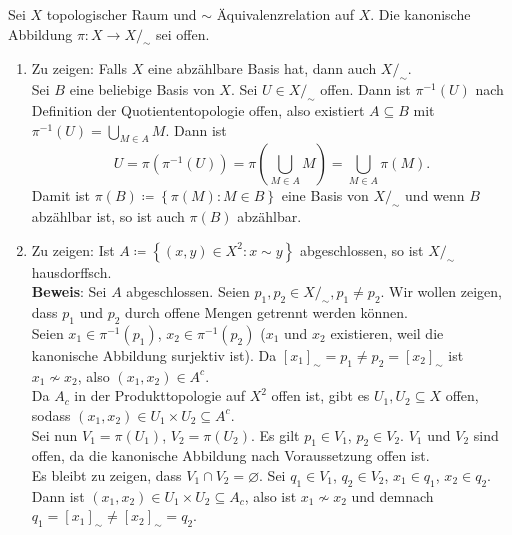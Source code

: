 \begin{problem*}[4]
  Sei $ X $ topologischer Raum und $ \sim $ Äquivalenzrelation auf $ X $. Die kanonische Abbildung $ \pi : X \to X/_\sim $ sei offen.
  \begin{enumerate}
    \item Zu zeigen: Falls $ X $ eine abzählbare Basis hat, dann auch $ X/_\sim $. \\
      Sei $ B $ eine beliebige Basis von $ X $. Sei $ U \in X/_\sim $ offen. Dann ist $ \pi^{-1}(U) $ nach Definition der Quotiententopologie offen, also existiert $ A \subseteq B $ mit $ \pi^{-1}(U) = \bigcup_{M \in A}M $. Dann ist
      \begin{equation*}
        U = \pi(\pi^{-1}(U)) = \pi\left( \bigcup_{M \in A} M \right) = \bigcup_{M \in A}\pi(M)\text{.}
      \end{equation*}
      Damit ist $ \pi(B) \coloneqq \left\{ \pi(M) : M \in B \right\} $ eine Basis von $ X/_\sim $ und wenn $ B $ abzählbar ist, so ist auch $ \pi(B) $ abzählbar.
    \item Zu zeigen: Ist $ A \coloneqq \left\{ (x,y) \in X^2 : x \sim y \right\} $ abgeschlossen, so ist $ X/_\sim $ hausdorffsch. \\
    \textbf{Beweis}: Sei $ A $ abgeschlossen. Seien $ p_1, p_2 \in X/_\sim, p_1 \neq p_2 $. Wir wollen zeigen, dass $ p_1 $ und $ p_2 $ durch offene Mengen getrennt werden können. \\
    Seien $ x_1 \in \pi^{-1}(p_1) $, $ x_2 \in \pi^{-1}(p_2) $ ($ x_1 $ und $ x_2 $ existieren, weil die kanonische Abbildung surjektiv ist). Da $ [x_1]_\sim = p_1 \neq p_2 = [x_2]_\sim $ ist $ x_1 \not \sim x_2 $, also $ (x_1, x_2) \in A^c $. \\
    Da $ A_c $ in der Produkttopologie auf $ X^2 $ offen ist, gibt es $ U_1, U_2 \subseteq X $ offen, sodass $ (x_1, x_2) \in U_1 \times U_2 \subseteq A^c $. \\
    Sei nun $ V_1 = \pi(U_1) $, $ V_2 = \pi(U_2) $. Es gilt $ p_1 \in V_1 $, $ p_2 \in V_2 $. $ V_1 $ und $ V_2 $ sind offen, da die kanonische Abbildung nach Voraussetzung offen ist. \\
    Es bleibt zu zeigen, dass $ V_1 \cap V_2 = \varnothing $. Sei $ q_1 \in V_1 $, $ q_2 \in V_2 $, $ x_1 \in q_1 $, $ x_2 \in q_2 $. Dann ist $ (x_1, x_2) \in U_1 \times U_2 \subseteq A_c $, also ist $ x_1 \not \sim x_2 $ und demnach $ q_1 = [x_1]_\sim \neq [x_2]_\sim = q_2 $.
  \end{enumerate}
\end{problem*}

